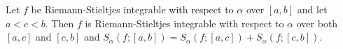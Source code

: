 Let $f$ be Riemann-Stieltjes integrable with respect to $\alpha$ over $[a, b]$ and let $a < c < b$. Then $f$ is Riemann-Stieltjes integrable with respect to $\alpha$ over both $[a, c]$ and $[c, b]$ and $S_{\alpha}(f; [a, b]) = S_{\alpha}(f; [a, c]) + S_{\alpha}(f; [c, b])$.
